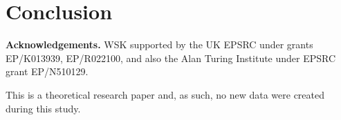 \documentclass[]{article}
\newcommand{\SIR}{\emph{SIR}\xspace}
\begin{document}

 \section{Conclusion}\label{sec:conclusion}
%

\bigskip
\noindent \textbf{Acknowledgements.} 
WSK supported by the UK EPSRC under grants EP/K013939, EP/R022100, and also
the Alan Turing Institute under EPSRC grant EP/N510129.

This is a theoretical research paper and, as such, no new data were created during this study.  
   
   

\appendix
\twocolumn
{}
\setcounter{page}{1}

\TrackingPostamble
 
\end{document}
